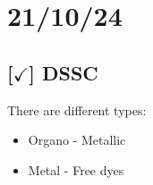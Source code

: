 \section{21/10/24}

\subsection{[$\checkmark$] DSSC}

There are different types:

\begin{itemize}
    \item Organo - Metallic
    \item Metal - Free dyes
\end{itemize}